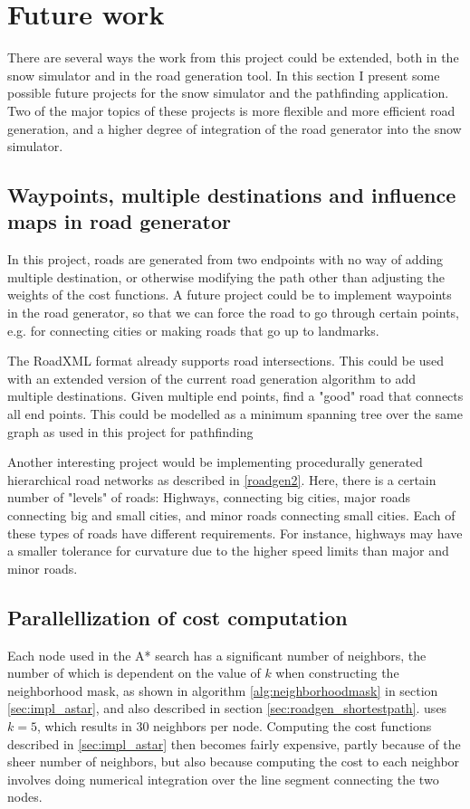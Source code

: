 \chapter{Future work}
\label{chap:futurework}
There are several ways the work from this project could be extended, both in the snow simulator and in the road generation tool. In this section I present some possible future projects for the snow simulator and the pathfinding application. Two of the major topics of these projects is more flexible and more efficient road generation, and a higher degree of integration of the road generator into the snow simulator.

\section{Waypoints, multiple destinations and influence maps in road generator}
In this project, roads are generated from two endpoints with no way of adding multiple destination, or otherwise modifying the path other than adjusting the weights of the cost functions. A future project could be to implement waypoints in the road generator, so that we can force the road to go through certain points, e.g. for connecting cities or making roads that go up to landmarks. 

The RoadXML format already supports road intersections. This could be used with an extended version of the current road generation algorithm to add multiple destinations. Given multiple end points, find a "good" road that connects all end points. This could be modelled as a minimum spanning tree over the same graph as used in this project for pathfinding

Another interesting project would be implementing procedurally generated hierarchical road networks as described in \ref{roadgen2}. Here, there is a certain number of "levels" of roads: Highways, connecting big cities, major roads connecting big and small cities, and minor roads connecting small cities. Each of these types of roads have different requirements. For instance, highways may have a smaller tolerance for curvature due to the higher speed limits than major and minor roads. 


\section{Parallellization of cost computation}
\label{sec:future_parallelization}
Each node used in the A* search has a significant number of neighbors, the number of which is dependent on the value of $k$ when constructing the neighborhood mask, as shown in algorithm \ref{alg:neighborhoodmask} in section \ref{sec:impl_astar}, and also described in section \ref{sec:roadgen_shortestpath}. \cite{roadgen} uses $k=5$, which results in 30 neighbors per node. Computing the cost functions described in \ref{sec:impl_astar} then becomes fairly expensive, partly because of the sheer number of neighbors, but also because computing the cost to each neighbor involves doing numerical integration over the line segment connecting the two nodes.

